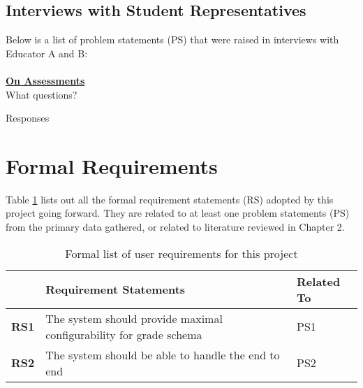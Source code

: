 \subsection{Interviews with Student Representatives}

Below is a list of problem statements (PS) that were raised in interviews with Educator A and B:\\
\\
\underline{\textbf{On Assessments}}
\\
What questions?

Responses

\section{Formal Requirements}

Table \ref{table:formal-reqs} lists out all the formal requirement statements (RS) adopted by this 
project going forward. They are related to at least one problem statements (PS) from the primary data 
gathered, or related to literature reviewed in Chapter 2.

\begin{table}[!h] 
    \caption{Formal list of user requirements for this project}
    \centering
    \label{table:formal-reqs}
    \begin{tabularx}{\textwidth}{>{\bfseries}lXl}
        & Requirement Statements & Related To\\
        \toprule
        RS1 & The system should provide maximal configurability for grade schema & PS1\\\midrule
        RS2 & The system should be able to handle the end to end 
        & PS2\\\bottomrule
    \end{tabularx}
\end{table}